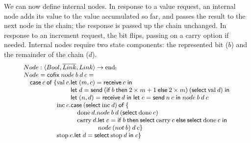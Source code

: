 \documentclass[orivec,envcountsame]{llncs}
\makeatletter
\newcommand{\gvdual}[1]{\overline{#1}}
\newcommand{\uto}{\ensuremath{\rightarrow}}
\newcommand{\outterm}{\mathrm{end}_!}
\newcommand{\mkwd}[1]{\mathsf{#1}}
\newcommand{\clabel}[1]{\mathrm{#1}}
\newcommand{\gvsend}[2]{\mkwd{send}\:#1\:#2}
\newcommand{\gvreceive}[1]{\mkwd{receive}\:#1}
\newcommand{\gvlet}[3]{\mkwd{let}\;#1 = #2\;\mkwd{in}\;#3}
\newcommand{\gvselect}[2]{\mkwd{select}\:#1\:#2}
\newcommand{\lrkwd}{\mkwd{cofix}}
\newcommand{\gvifthen}[3]{\mkwd{if}\:#1\:\mkwd{then}\:#2\:\mkwd{else}\:#3}
\newcommand{\ba}{\begin{array}}
\newcommand{\ea}{\end{array}}
\newcommand{\bl}{\ba[t]{@{}l@{}}}
\newcommand{\el}{\ea}
\makeatother
\begin{document}
We can now define internal nodes. In response to a value request, an internal node adds its value to
the value accumulated so far, and passes the result to the next node in the chain; the response is
passed up the chain unchanged. In response to an increment request, the bit flips, passing on a
carry option if needed. Internal nodes require two state components: the represented bit ($b$) and
the remainder of the chain ($d$).
%
\[\small
\bl
Node : \langle Bool, \gvdual{Link}, Link \rangle \uto \outterm \\
Node = \lrkwd\:node\:b\:d\:c = \\
\quad
  \bl
  \mkwd{case}\:c\:\mkwd{of}\:\{
      \bl
      \clabel{val}\:c.
        \bl
        \gvlet{(m,c)}{\gvreceive{c}}{} \\
        \gvlet{d}{\gvsend{(\gvifthen{b}{2 \times m + 1}{2 \times m})}{(\gvselect{\clabel{val}}{d})}}{} \\
        \gvlet{(n,d)}{\gvreceive{d}}{
        \gvlet{c}{\gvsend{n}{c}}{
        node\:b\:d\:c}} \\
        \el \\
      \clabel{inc}\:c.
        \bl
        \mkwd{case}\:(\gvselect{\clabel{inc}}{d})\:\mkwd{of}\:\{ \\
        \quad
          \bl
          \clabel{done}\:d. node\:b\:d\:(\gvselect{\clabel{done}}{c}) \\
          \clabel{carry}\:d.
            \bl
            \gvlet{c}{\gvifthen{b}{\gvselect{\clabel{carry}}{c}}{\gvselect{\clabel{done}}{c}}}{} \\
            node\:(not\:b)\:d\:c \} \\
            \el \\
          \el \\
        \el \\
      \clabel{stop}\:c. \gvlet{d}{\gvselect{\clabel{stop}}{d}}{c} \} \\
      \el \\
  \el \\
\el
\]
\end{document}
